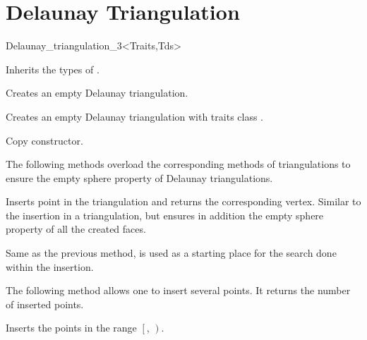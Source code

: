 \section{Delaunay Triangulation} 

\begin{ccClassTemplate}{Delaunay_triangulation_3<Traits,Tds>}
\ccDefinition
{}



\ccTypes

Inherits the types of .

\ccCreation
{}

{Creates an empty Delaunay triangulation.}

{Creates an empty Delaunay triangulation with traits class
.}

{Copy constructor.}

\ccModifiers


The following methods overload the corresponding methods of
triangulations to ensure the empty sphere property of Delaunay 
triangulations.

{Inserts point  in the triangulation and returns the corresponding
 vertex. Similar to the insertion in a triangulation, but ensures in
addition the empty sphere property of all the created faces.}

{Same as the previous method,  is used as a starting
place for the search done within the insertion.}

The following method allows one to insert several points. It returns the
number of inserted points. 

{Inserts the points in the range $\left[\right.$,
$\left.\right)$. 
}


\end{ccClassTemplate}

